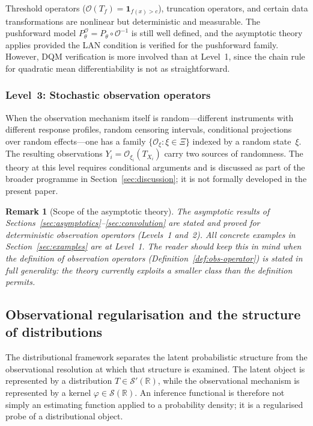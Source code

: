 \documentclass[11pt,a4paper]{article}
\newtheorem{remark}[theorem]{Remark}
\newcommand{\R}{\mathbb{R}}
\begin{document}
Threshold operators ($\mathcal O(T_f) = \mathbf{1}_{f(x) > c}$),
truncation operators, and certain data transformations are nonlinear but
deterministic and measurable.  The pushforward model
$P_\theta^{\mathcal O} = P_\theta \circ \mathcal O^{-1}$ is still well
defined, and the asymptotic theory applies provided the LAN condition is
verified for the pushforward family.  However, DQM verification is more
involved than at Level~1, since the chain rule for quadratic mean
differentiability is not as straightforward.

\subsubsection*{Level~3: Stochastic observation operators}

When the observation mechanism itself is random---different instruments
with different response profiles, random censoring intervals, conditional
projections over random effects---one has a family
$\{\mathcal O_\xi : \xi \in \Xi\}$ indexed by a random state~$\xi$.
The resulting observations $Y_i = \mathcal O_{\xi_i}(T_{X_i})$ carry
two sources of randomness.  The theory at this level requires conditional
arguments and is discussed as part of the broader programme in
Section~\ref{sec:discussion}; it is not formally developed in the
present paper.

\begin{remark}[Scope of the asymptotic theory]\label{rem:operator-scope}
The asymptotic results of Sections~\ref{sec:asymptotics}--\ref{sec:convolution}
are stated and proved for deterministic observation operators (Levels~1
and~2).  All concrete examples in Section~\ref{sec:examples} are at
Level~1.  The reader should keep this in mind when the definition of
observation operators (Definition~\ref{def:obs-operator}) is stated in
full generality: the theory currently exploits a smaller class than the
definition permits.
\end{remark}

\subsection{Observational regularisation and the structure of distributions}\label{subsec:obs-regularisation}

The distributional framework separates the latent probabilistic structure
from the observational resolution at which that structure is examined.  The
latent object is represented by a distribution $T \in \mathcal S'(\R)$,
while the observational mechanism is represented by a kernel
$\varphi \in \mathcal S(\R)$.  An inference functional is therefore not
simply an estimating function applied to a probability density; it is a
regularised probe of a distributional object.
\end{document}
